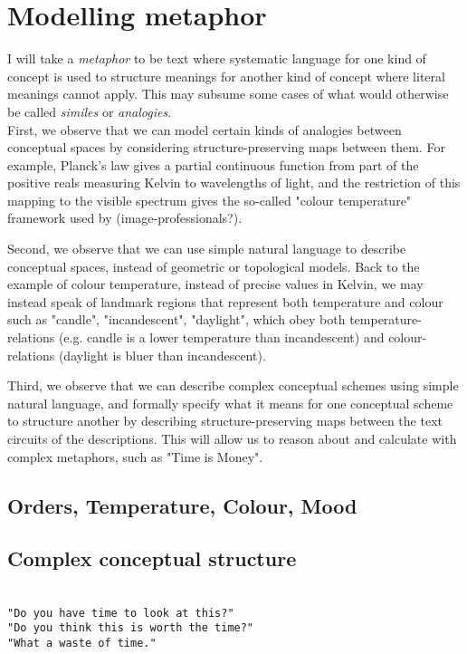 \section{Modelling metaphor}

I will take a \emph{metaphor} to be text where systematic language for one kind of concept is used to structure meanings for another kind of concept where literal meanings cannot apply. This may subsume some cases of what would otherwise be called \emph{similes} or \emph{analogies}.\\

 First, we observe that we can model certain kinds of analogies between conceptual spaces by considering structure-preserving maps between them. For example, Planck's law gives a partial continuous function from part of the positive reals measuring Kelvin to wavelengths of light, and the restriction of this mapping to the visible spectrum gives the so-called "colour temperature" framework used by (image-professionals?).

Second, we observe that we can use simple natural language to describe conceptual spaces, instead of geometric or topological models. Back to the example of colour temperature, instead of precise values in Kelvin, we may instead speak of landmark regions that represent both temperature and colour such as "candle", "incandescent", "daylight", which obey both temperature-relations (e.g. candle is a lower temperature than incandescent) and colour-relations (daylight is bluer than incandescent).

Third, we observe that we can describe complex conceptual schemes using simple natural language, and formally specify what it means for one conceptual scheme to structure another by describing structure-preserving maps between the text circuits of the descriptions. This will allow us to reason about and calculate with complex metaphors, such as "Time is Money".


\subsection{Orders, Temperature, Colour, Mood}

\subsection{Complex conceptual structure}

\\
\texttt{"Do you have time to look at this?"}\\
\texttt{"Do you think this is worth the time?"}\\
\texttt{"What a waste of time."}

